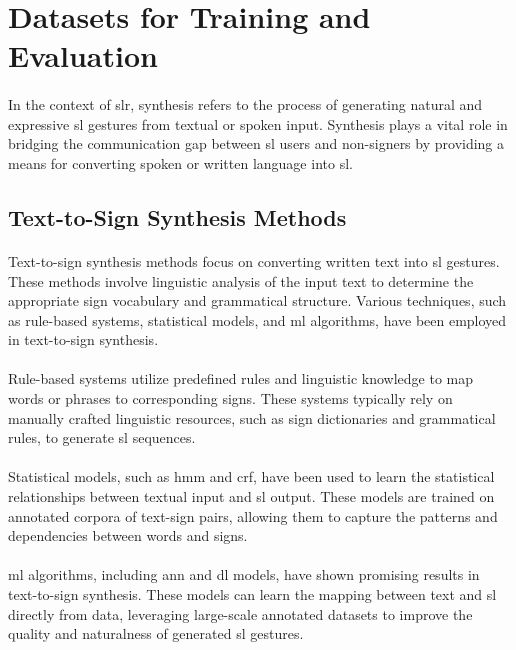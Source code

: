 \section{Datasets for Training and Evaluation}
\paragraph{}
In the context of \ac{slr}, synthesis refers to the process of generating natural and expressive \ac{sl} gestures from textual or spoken input. Synthesis plays a vital role in bridging the communication gap between \ac{sl} users and non-signers by providing a means for converting spoken or written language into \ac{sl}.
\subsection{Text-to-Sign Synthesis Methods}
\paragraph{}
Text-to-sign synthesis methods focus on converting written text into \ac{sl} gestures. These methods involve linguistic analysis of the input text to determine the appropriate sign vocabulary and grammatical structure. Various techniques, such as rule-based systems, statistical models, and \ac{ml} algorithms, have been employed in text-to-sign synthesis.
\paragraph{}
Rule-based systems utilize predefined rules and linguistic knowledge to map words or phrases to corresponding signs. These systems typically rely on manually crafted linguistic resources, such as sign dictionaries and grammatical rules, to generate \ac{sl} sequences.
\paragraph{}
Statistical models, such as \ac{hmm} and \ac{crf}, have been used to learn the statistical relationships between textual input and \ac{sl} output. These models are trained on annotated corpora of text-sign pairs, allowing them to capture the patterns and dependencies between words and signs.
\paragraph{}
\ac{ml} algorithms, including \ac{ann} and \ac{dl} models, have shown promising results in text-to-sign synthesis. These models can learn the mapping between text and \ac{sl} directly from data, leveraging large-scale annotated datasets to improve the quality and naturalness of generated \ac{sl} gestures.
